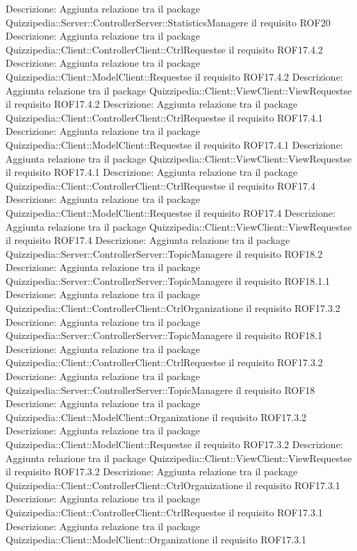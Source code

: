 Descrizione: Aggiunta relazione tra il package Quizzipedia::Server::ControllerServer::StatisticsManagere il requisito ROF20 
Descrizione: Aggiunta relazione tra il package Quizzipedia::Client::ControllerClient::CtrlRequestse il requisito ROF17.4.2 
Descrizione: Aggiunta relazione tra il package Quizzipedia::Client::ModelClient::Requestse il requisito ROF17.4.2 
Descrizione: Aggiunta relazione tra il package Quizzipedia::Client::ViewClient::ViewRequestse il requisito ROF17.4.2 
Descrizione: Aggiunta relazione tra il package Quizzipedia::Client::ControllerClient::CtrlRequestse il requisito ROF17.4.1 
Descrizione: Aggiunta relazione tra il package Quizzipedia::Client::ModelClient::Requestse il requisito ROF17.4.1 
Descrizione: Aggiunta relazione tra il package Quizzipedia::Client::ViewClient::ViewRequestse il requisito ROF17.4.1 
Descrizione: Aggiunta relazione tra il package Quizzipedia::Client::ControllerClient::CtrlRequestse il requisito ROF17.4 
Descrizione: Aggiunta relazione tra il package Quizzipedia::Client::ModelClient::Requestse il requisito ROF17.4 
Descrizione: Aggiunta relazione tra il package Quizzipedia::Client::ViewClient::ViewRequestse il requisito ROF17.4 
Descrizione: Aggiunta relazione tra il package Quizzipedia::Server::ControllerServer::TopicManagere il requisito ROF18.2 
Descrizione: Aggiunta relazione tra il package Quizzipedia::Server::ControllerServer::TopicManagere il requisito ROF18.1.1 
Descrizione: Aggiunta relazione tra il package Quizzipedia::Client::ControllerClient::CtrlOrganizatione il requisito ROF17.3.2 
Descrizione: Aggiunta relazione tra il package Quizzipedia::Server::ControllerServer::TopicManagere il requisito ROF18.1 
Descrizione: Aggiunta relazione tra il package Quizzipedia::Client::ControllerClient::CtrlRequestse il requisito ROF17.3.2 
Descrizione: Aggiunta relazione tra il package Quizzipedia::Server::ControllerServer::TopicManagere il requisito ROF18 
Descrizione: Aggiunta relazione tra il package Quizzipedia::Client::ModelClient::Organizatione il requisito ROF17.3.2 
Descrizione: Aggiunta relazione tra il package Quizzipedia::Client::ModelClient::Requestse il requisito ROF17.3.2 
Descrizione: Aggiunta relazione tra il package Quizzipedia::Client::ViewClient::ViewRequestse il requisito ROF17.3.2 
Descrizione: Aggiunta relazione tra il package Quizzipedia::Client::ControllerClient::CtrlOrganizatione il requisito ROF17.3.1 
Descrizione: Aggiunta relazione tra il package Quizzipedia::Client::ControllerClient::CtrlRequestse il requisito ROF17.3.1 
Descrizione: Aggiunta relazione tra il package Quizzipedia::Client::ModelClient::Organizatione il requisito ROF17.3.1 
